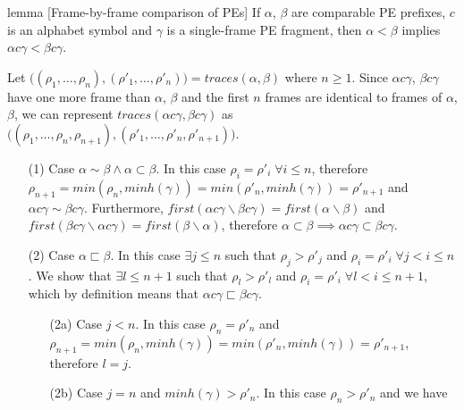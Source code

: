 \documentclass[AMA,STIX1COL]{WileyNJD-v2}
\begin{document}
\begin{theoremEnd}[restate, no link to proof, no link to theorem, category=lemma_frames]{lemma}
[Frame-by-frame comparison of PEs]
    \label{lemma_incr_cmp_frames}
    If $\alpha$, $\beta$ are comparable PE prefixes,
    $c$ is an alphabet symbol and
    $\gamma$ is a single-frame PE fragment,
    then $\alpha < \beta$ implies $\alpha c \gamma < \beta c \gamma$.
\end{theoremEnd}
\begin{proofEnd}
    Let $\big((\rho_1, \dots, \rho_n), (\rho'_1, \dots, \rho'_n)\big) = traces(\alpha, \beta)$ where $n \geq 1$.
    Since $\alpha c \gamma$, $\beta c \gamma$ have one more frame than $\alpha$, $\beta$
    and the first $n$ frames are identical to frames of $\alpha$, $\beta$,
    we can represent $traces(\alpha c \gamma, \beta c \gamma)$
    as $\big((\rho_1, \dots, \rho_n, \rho_{n+1}), (\rho'_1, \dots, \rho'_n, \rho'_{n+1})\big)$.
    \begin{itemize}[itemsep=0.5em, topsep=0.5em]
    \item[(1)]
        Case $\alpha \sim \beta \wedge \alpha \subset \beta$.
        In this case $\rho_i = \rho'_i \;\forall i \leq n$,
        therefore $\rho_{n+1} = min(\rho_n, minh(\gamma)) = min(\rho'_n, minh(\gamma)) = \rho'_{n+1}$
        and $\alpha c \gamma \sim \beta c \gamma$.
        Furthermore,
        $first (\alpha c \gamma \backslash \beta c \gamma) = first (\alpha \backslash \beta)$ and
        $first (\beta c \gamma \backslash \alpha c \gamma) = first (\beta \backslash \alpha)$,
        therefore $\alpha \subset \beta \implies \alpha c \gamma \subset \beta c \gamma$.
    \item[(2)]
        Case $\alpha \sqsubset \beta$.
        In this case $\exists j \leq n$ such that $\rho_j > \rho'_j$ and $\rho_i = \rho'_i \;\forall j < i \leq n$.
        We show that $\exists l \leq n + 1$ such that $\rho_l > \rho'_l$ and $\rho_i = \rho'_i \;\forall l < i \leq n + 1$,
        which by definition means that $\alpha c \gamma \sqsubset \beta c \gamma$.
        \begin{itemize}
        \item[(2a)]
            Case $j < n$.
            In this case $\rho_n = \rho'_n$ and
            $\rho_{n+1} = min(\rho_n, minh(\gamma)) = min(\rho'_n, minh(\gamma)) = \rho'_{n+1}$,
            therefore $l = j$.
        \item[(2b)]
            Case $j = n$ and $minh(\gamma) > \rho'_n$.
            In this case $\rho_n > \rho'_n$ and we have

\end{itemize}
\end{itemize}
\end{proofEnd}
\end{document}
